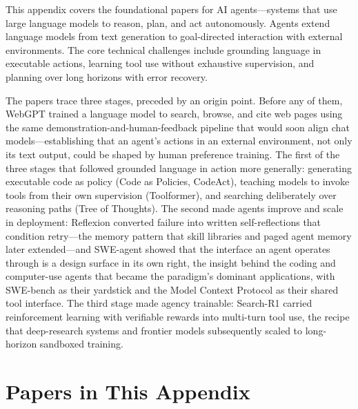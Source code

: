 
This appendix covers the foundational papers for AI agents---systems that use large language models to reason, plan, and act autonomously. Agents extend language models from text generation to goal-directed interaction with external environments. The core technical challenges include grounding language in executable actions, learning tool use without exhaustive supervision, and planning over long horizons with error recovery.

The papers trace three stages, preceded by an origin point. Before any of them, WebGPT trained a language model to search, browse, and cite web pages using the same demonstration-and-human-feedback pipeline that would soon align chat models---establishing that an agent's actions in an external environment, not only its text output, could be shaped by human preference training. The first of the three stages that followed grounded language in action more generally: generating executable code as policy (Code as Policies, CodeAct), teaching models to invoke tools from their own supervision (Toolformer), and searching deliberately over reasoning paths (Tree of Thoughts). The second made agents improve and scale in deployment: Reflexion converted failure into written self-reflections that condition retry---the memory pattern that skill libraries and paged agent memory later extended---and SWE-agent showed that the interface an agent operates through is a design surface in its own right, the insight behind the coding and computer-use agents that became the paradigm's dominant applications, with SWE-bench as their yardstick and the Model Context Protocol as their shared tool interface. The third stage made agency trainable: Search-R1 carried reinforcement learning with verifiable rewards into multi-turn tool use, the recipe that deep-research systems and frontier models subsequently scaled to long-horizon sandboxed training.

\section*{Papers in This Appendix}

